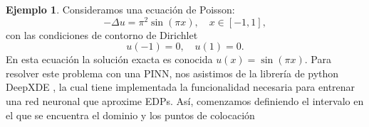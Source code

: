 \documentclass[a4paper,11pt,spanish, twoside, leqno]{tfg-uam}
\theoremstyle{definition}
\newtheorem{exmp}[teor]{Ejemplo}
\begin{document}
\begin{mdframed}
    \begin{exmp}
        Consideramos una ecuación de Poisson:
        \begin{equation*}
        -\Delta u = \pi^2 \sin(\pi x), \quad x \in [-1, 1],
        \end{equation*}
        con las condiciones de contorno de Dirichlet
        \begin{equation*}
        u(-1) = 0, \quad u(1) = 0.
        \end{equation*}
        En esta ecuación la solución exacta es  conocida $ u(x) = \sin(\pi x)$. Para resolver este problema con una PINN, nos asistimos de la librería de python DeepXDE \cite{lu2021deepxde}, la cual tiene implementada la funcionalidad necesaria para entrenar una red neuronal que aproxime EDPs. Así, comenzamos definiendo el intervalo en el que se encuentra el dominio y los puntos de colocación
        

\end{exmp}
\end{mdframed}
\end{document}
